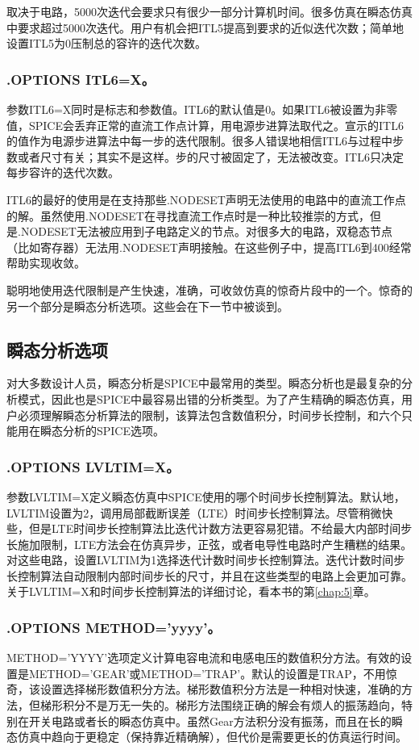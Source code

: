 取决于电路，5000次迭代会要求只有很少一部分计算机时间。很多仿真在瞬态仿真中要求超过5000次迭代。用户有机会把ITL5提高到要求的近似迭代次数；简单地设置ITL5为0压制总的容许的迭代次数。

\subsubsection{.OPTIONS ITL6=X。}
参数ITL6=X同时是标志和参数值。ITL6的默认值是0。如果ITL6被设置为非零值，SPICE会丢弃正常的直流工作点计算，用电源步进算法取代之。宣示的ITL6的值作为电源步进算法中每一步的迭代限制。很多人错误地相信ITL6与过程中步数或者尺寸有关；其实不是这样。步的尺寸被固定了，无法被改变。ITL6只决定每步容许的迭代次数。

ITL6的最好的使用是在支持那些.NODESET声明无法使用的电路中的直流工作点的解。虽然使用.NODESET在寻找直流工作点时是一种比较推崇的方式，但是.NODESET无法被应用到子电路定义的节点。对很多大的电路，双稳态节点（比如寄存器）无法用.NODESET声明接触。在这些例子中，提高ITL6到400经常帮助实现收敛。

聪明地使用迭代限制是产生快速，准确，可收敛仿真的惊奇片段中的一个。惊奇的另一个部分是瞬态分析选项。这些会在下一节中被谈到。

\subsection{瞬态分析选项}
对大多数设计人员，瞬态分析是SPICE中最常用的类型。瞬态分析也是最复杂的分析模式，因此也是SPICE中最容易出错的分析类型。为了产生精确的瞬态仿真，用户必须理解瞬态分析算法的限制，该算法包含数值积分，时间步长控制，和六个只能用在瞬态分析的SPICE选项。

\subsubsection{.OPTIONS LVLTIM=X。}
参数LVLTIM=X定义瞬态仿真中SPICE使用的哪个时间步长控制算法。默认地，LVLTIM设置为2，调用局部截断误差（LTE）时间步长控制算法。尽管稍微快些，但是LTE时间步长控制算法比迭代计数方法更容易犯错。不给最大内部时间步长施加限制，LTE方法会在仿真异步，正弦，或者电导性电路时产生糟糕的结果。对这些电路，设置LVLTIM为1选择迭代计数时间步长控制算法。迭代计数时间步长控制算法自动限制内部时间步长的尺寸，并且在这些类型的电路上会更加可靠。关于LVLTIM=X和时间步长控制算法的详细讨论，看本书的第\ref{chap:5}章。

\subsubsection{.OPTIONS METHOD='yyyy'。}
METHOD='YYYY'选项定义计算电容电流和电感电压的数值积分方法。有效的设置是METHOD='GEAR'或METHOD='TRAP'。默认的设置是TRAP，不用惊奇，该设置选择梯形数值积分方法。梯形数值积分方法是一种相对快速，准确的方法，但梯形积分不是万无一失的。梯形方法围绕正确的解会有烦人的振荡趋向，特别在开关电路或者长的瞬态仿真中。虽然Gear方法积分没有振荡，而且在长的瞬态仿真中趋向于更稳定（保持靠近精确解），但代价是需要更长的仿真运行时间。

